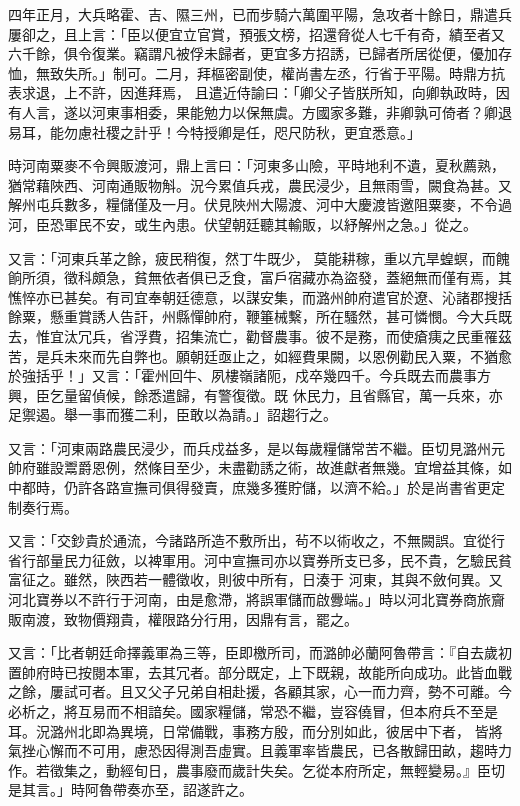 \begin{pinyinscope}
 四年正月，大兵略霍、吉、隰三州，已而步騎六萬圍平陽，急攻者十餘日，鼎遣兵屢卻之，且上言：「臣以便宜立官賞，預張文榜，招還脅從人七千有奇，績至者又六千餘，俱令復業。竊謂凡被俘未歸者，更宜多方招誘，已歸者所居從便，優加存恤，無致失所。」制可。二月，拜樞密副使，權尚書左丞，行省于平陽。時鼎方抗表求退，上不許，因進拜焉，
 且遣近侍諭曰：「卿父子皆朕所知，向卿執政時，因有人言，遂以河東事相委，果能勉力以保無虞。方國家多難，非卿孰可倚者？卿退易耳，能勿慮社稷之計乎！今特授卿是任，咫尺防秋，更宜悉意。」



 時河南粟麥不令興販渡河，鼎上言曰：「河東多山險，平時地利不遺，夏秋薦熟，猶常藉陜西、河南通販物斛。況今累值兵戎，農民浸少，且無雨雪，闕食為甚。又解州屯兵數多，糧儲僅及一月。伏見陜州大陽渡、河中大慶渡皆邀阻粟麥，不令過河，臣恐軍民不安，或生內患。伏望朝廷聽其輸販，以紓解州之急。」從之。



 又言：「河東兵革之餘，疲民稍復，然丁牛既少，
 莫能耕稼，重以亢旱蝗螟，而餽餉所須，徵科頗急，貧無依者俱已乏食，富戶宿藏亦為盜發，蓋絕無而僅有焉，其憔悴亦已甚矣。有司宜奉朝廷德意，以謀安集，而潞州帥府遣官於遼、沁諸郡搜括餘粟，懸重賞誘人告訐，州縣憚帥府，鞭箠械繫，所在騷然，甚可憐憫。今大兵既去，惟宜汰冗兵，省浮費，招集流亡，勸督農事。彼不是務，而使瘡痍之民重罹茲苦，是兵未來而先自弊也。願朝廷亟止之，如經費果闕，以恩例勸民入粟，不猶愈於強括乎！」又言：「霍州回牛、夙樓嶺諸阨，戍卒幾四千。今兵既去而農事方興，臣乞量留偵候，餘悉遣歸，有警復徵。既
 休民力，且省縣官，萬一兵來，亦足禦遏。舉一事而獲二利，臣敢以為請。」詔趨行之。



 又言：「河東兩路農民浸少，而兵戍益多，是以每歲糧儲常苦不繼。臣切見潞州元帥府雖設鬻爵恩例，然條目至少，未盡勸誘之術，故進獻者無幾。宜增益其條，如中都時，仍許各路宣撫司俱得發賣，庶幾多獲貯儲，以濟不給。」於是尚書省更定制奏行焉。



 又言：「交鈔貴於通流，今諸路所造不敷所出，茍不以術收之，不無闕誤。宜從行省行部量民力征斂，以裨軍用。河中宣撫司亦以寶券所支已多，民不貴，乞驗民貧富征之。雖然，陜西若一體徵收，則彼中所有，日湊于
 河東，其與不斂何異。又河北寶券以不許行于河南，由是愈滯，將誤軍儲而啟釁端。」時以河北寶券商旅齎販南渡，致物價翔貴，權限路分行用，因鼎有言，罷之。



 又言：「比者朝廷命擇義軍為三等，臣即檄所司，而潞帥必蘭阿魯帶言：『自去歲初置帥府時已按閱本軍，去其冗者。部分既定，上下既親，故能所向成功。此皆血戰之餘，屢試可者。且又父子兄弟自相赴援，各顧其家，心一而力齊，勢不可離。今必析之，將互易而不相諳矣。國家糧儲，常恐不繼，豈容僥冒，但本府兵不至是耳。況潞州北即為異境，日常備戰，事務方殷，而分別如此，彼居中下者，
 皆將氣挫心懈而不可用，慮恐因得測吾虛實。且義軍率皆農民，已各散歸田畝，趨時力作。若徵集之，動經旬日，農事廢而歲計失矣。乞從本府所定，無輕變易。』臣切是其言。」時阿魯帶奏亦至，詔遂許之。




\end{pinyinscope}

